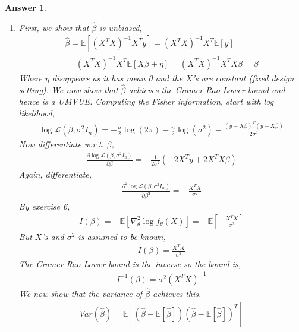\documentclass[12pt]{article}
\theoremstyle{colon}
\newtheorem*{answer}{Answer}
\begin{document}
\begin{answer}
  \leavevmode
  \begin{enumerate}[label=\arabic*)]
    \item First, we show that $\widehat{\beta}$ is unbiased,
      \begin{gather*}
        \mathbb{\widehat{\beta}} = \mathbb{E}[(X^TX)^{-1}X^T y] = (X^TX)^{-1}X^T \mathbb{E}[y] \\
        = (X^TX)^{-1}X^T \mathbb{E}[X\beta + \eta] = (X^TX)^{-1}X^TX \beta = \beta
      \end{gather*}
      Where $\eta$ disappears as it has mean 0 and the $X$'s are constant (fixed design setting). We now show that $\widehat{\beta}$ achieves the Cramer-Rao Lower bound and hence is a UMVUE. Computing the Fisher information, start with log likelihood,
      \begin{gather*}
        \log \mathcal{L}(\beta, \sigma^2 I_n) = - \frac{n}{2} \log(2 \pi) - \frac{n}{2} \log(\sigma^2) - \frac{(y-X\beta)^T(y-X\beta)}{2\sigma^2}
      \end{gather*}
      Now differentiate w.r.t. $\beta$,
      \begin{gather*}
        \frac{\partial \log \mathcal{L}(\beta, \sigma^2 I_n)}{\partial \beta} = -\frac{1}{2\sigma^2}(-2X^Ty +2X^T X \beta)
      \end{gather*}
      Again, differentiate,
      \begin{gather*}
        \frac{\partial^2 \log \mathcal{L}(\beta, \sigma^2 I_n)}{\partial \beta^2} = -\frac{X^T X}{\sigma^2}
      \end{gather*}
      By exercise 6,
      \begin{gather*}
        I(\beta) = - \mathbb{E}[\nabla_\theta^2 \log f_\theta(X)] = - \mathbb{E}[-\frac{X^T X}{\sigma^2}]
      \end{gather*}
      But $X$'s and $\sigma^2$ is assumed to be known,
      \begin{gather*}
        I(\beta) = \frac{X^T X}{\sigma^2}
      \end{gather*}
      The Cramer-Rao Lower bound is the inverse so the bound is,
      \begin{gather*}
        I^{-1}(\beta) = \sigma^2 (X^T X)^{-1}
      \end{gather*}
      We now show that the variance of $\widehat{\beta}$ achieves this.
      \begin{gather*}
        Var(\widehat{\beta}) = \mathbb{E}[(\widehat{\beta} - \mathbb{E}[\widehat{\beta}])(\widehat{\beta} - \mathbb{E}[\widehat{\beta}])^T] \\

\end{gather*}
\end{enumerate}
\end{answer}
\end{document}
